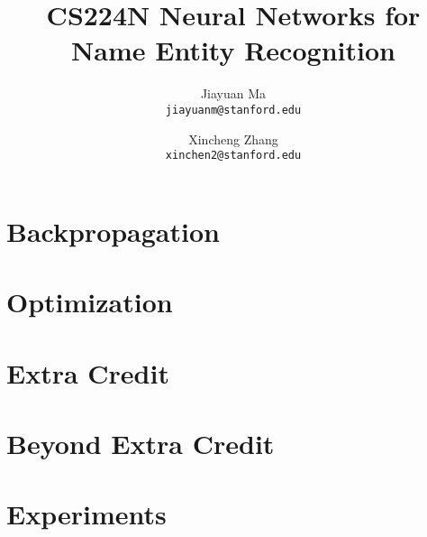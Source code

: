 \documentclass[letterpaper]{article}
\begin{document}
\title{CS224N Neural Networks for Name Entity Recognition}
\author{
        Jiayuan Ma \\
        \texttt{jiayuanm@stanford.edu}
        \and
        Xincheng Zhang\\
        \texttt{xinchen2@stanford.edu}
}
\maketitle

 
\section{Backpropagation}


\section{Optimization}


\section{Extra Credit}


\section{Beyond Extra Credit} 


\section{Experiments}
 
\end{document}
